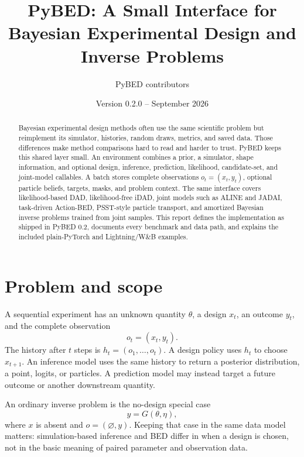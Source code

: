 \documentclass[11pt]{article}
\title{\textbf{PyBED: A Small Interface for Bayesian Experimental Design and Inverse Problems}}
\author{PyBED contributors}
\date{Version 0.2.0 -- September 2026}
\begin{document}
\maketitle

\begin{abstract}
Bayesian experimental design methods often use the same scientific problem but
reimplement its simulator, histories, random draws, metrics, and saved data. Those
differences make method comparisons hard to read and harder to trust. PyBED keeps
this shared layer small. An environment combines a prior, a simulator, shape
information, and optional design, inference, prediction, likelihood, candidate-set,
and joint-model callables. A batch stores complete observations
$o_t=(x_t,y_t)$, optional particle beliefs, targets, masks, and problem context.
The same interface covers likelihood-based DAD, likelihood-free iDAD, joint models
such as ALINE and JADAI, task-driven Action-BED, PSST-style particle transport,
and amortized Bayesian inverse problems trained from joint samples. This report
defines the implementation as shipped in PyBED 0.2, documents every benchmark and
data path, and explains the included plain-PyTorch and Lightning/W\&B examples.
\end{abstract}

\tableofcontents
\newpage

\section{Problem and scope}

A sequential experiment has an unknown quantity $\theta$, a design $x_t$, an
outcome $y_t$, and the complete observation
\begin{equation}
  o_t=(x_t,y_t).
\end{equation}
The history after $t$ steps is $h_t=(o_1,\ldots,o_t)$. A design policy uses
$h_t$ to choose $x_{t+1}$. An inference model uses the same history to return a
posterior distribution, a point, logits, or particles. A prediction model may
instead target a future outcome or another downstream quantity.

An ordinary inverse problem is the no-design special case
\begin{equation}
  y=G(\theta,\eta),
\end{equation}
where $x$ is absent and $o=(\varnothing,y)$. Keeping that case in the same data
model matters: simulation-based inference and BED differ in when a design is
chosen, not in the basic meaning of paired parameter and observation data.
\end{document}
